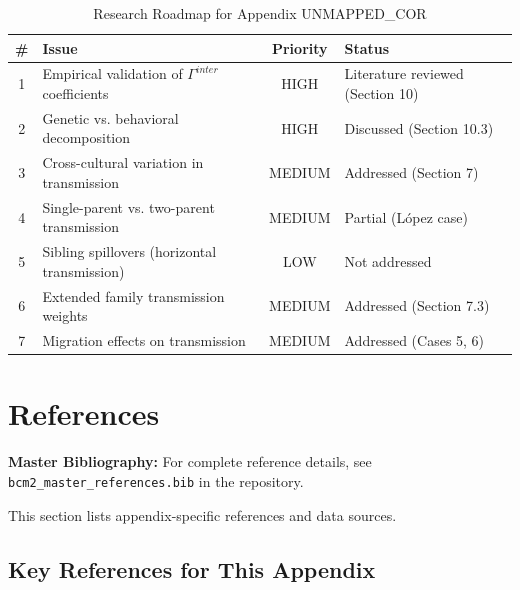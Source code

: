 \begin{table}[htbp]
\centering
\caption{Research Roadmap for Appendix UNMAPPED_COR}
\label{tab:BI-roadmap}
\renewcommand{\arraystretch}{1.3}
\begin{tabular}{@{}clcl@{}}
\toprule
\textbf{\#} & \textbf{Issue} & \textbf{Priority} & \textbf{Status} \\
\midrule
1 & Empirical validation of $\Gamma^{inter}$ coefficients & HIGH & Literature reviewed (Section 10) \\
2 & Genetic vs. behavioral decomposition & HIGH & Discussed (Section 10.3) \\
3 & Cross-cultural variation in transmission & MEDIUM & \cellcolor{green!20}Addressed (Section 7) \\
4 & Single-parent vs. two-parent transmission & MEDIUM & Partial (López case) \\
5 & Sibling spillovers (horizontal transmission) & LOW & Not addressed \\
6 & Extended family transmission weights & MEDIUM & \cellcolor{green!20}Addressed (Section 7.3) \\
7 & Migration effects on transmission & MEDIUM & \cellcolor{green!20}Addressed (Cases 5, 6) \\
\bottomrule
\end{tabular}
\end{table}


\section{References}
\label{sec:BI-references}

\begin{tcolorbox}[colback=blue!5!white, colframe=blue!75!black]
\textbf{Master Bibliography:} For complete reference details, see
\texttt{bcm2\_master\_references.bib} in the repository.

This section lists appendix-specific references and data sources.
\end{tcolorbox}

\vspace{0.5em}

\subsection{Key References for This Appendix}

